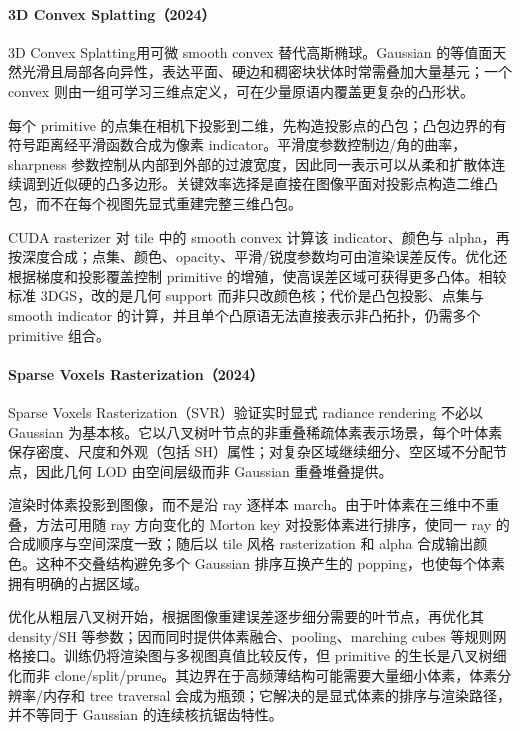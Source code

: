 \paragraph{3D Convex Splatting（2024）\cite{2411_14974}}
3D Convex Splatting用可微 smooth convex 替代高斯椭球。Gaussian 的等值面天然光滑且局部各向异性，表达平面、硬边和稠密块状体时常需叠加大量基元；一个 convex 则由一组可学习三维点定义，可在少量原语内覆盖更复杂的凸形状。

每个 primitive 的点集在相机下投影到二维，先构造投影点的凸包；凸包边界的有符号距离经平滑函数合成为像素 indicator。平滑度参数控制边/角的曲率，sharpness 参数控制从内部到外部的过渡宽度，因此同一表示可以从柔和扩散体连续调到近似硬的凸多边形。关键效率选择是直接在图像平面对投影点构造二维凸包，而不在每个视图先显式重建完整三维凸包。

CUDA rasterizer 对 tile 中的 smooth convex 计算该 indicator、颜色与 alpha，再按深度合成；点集、颜色、opacity、平滑/锐度参数均可由渲染误差反传。优化还根据梯度和投影覆盖控制 primitive 的增殖，使高误差区域可获得更多凸体。相较标准 3DGS，改的是几何 support 而非只改颜色核；代价是凸包投影、点集与 smooth indicator 的计算，并且单个凸原语无法直接表示非凸拓扑，仍需多个 primitive 组合。

\paragraph{Sparse Voxels Rasterization（2024）\cite{2412_04459}}
Sparse Voxels Rasterization（SVR）验证实时显式 radiance rendering 不必以 Gaussian 为基本核。它以八叉树叶节点的非重叠稀疏体素表示场景，每个叶体素保存密度、尺度和外观（包括 SH）属性；对复杂区域继续细分、空区域不分配节点，因此几何 LOD 由空间层级而非 Gaussian 重叠堆叠提供。

渲染时体素投影到图像，而不是沿 ray 逐样本 march。由于叶体素在三维中不重叠，方法可用随 ray 方向变化的 Morton key 对投影体素进行排序，使同一 ray 的合成顺序与空间深度一致；随后以 tile 风格 rasterization 和 alpha 合成输出颜色。这种不交叠结构避免多个 Gaussian 排序互换产生的 popping，也使每个体素拥有明确的占据区域。

优化从粗层八叉树开始，根据图像重建误差逐步细分需要的叶节点，再优化其 density/SH 等参数；因而同时提供体素融合、pooling、marching cubes 等规则网格接口。训练仍将渲染图与多视图真值比较反传，但 primitive 的生长是八叉树细化而非 clone/split/prune。其边界在于高频薄结构可能需要大量细小体素，体素分辨率/内存和 tree traversal 会成为瓶颈；它解决的是显式体素的排序与渲染路径，并不等同于 Gaussian 的连续核抗锯齿特性。

